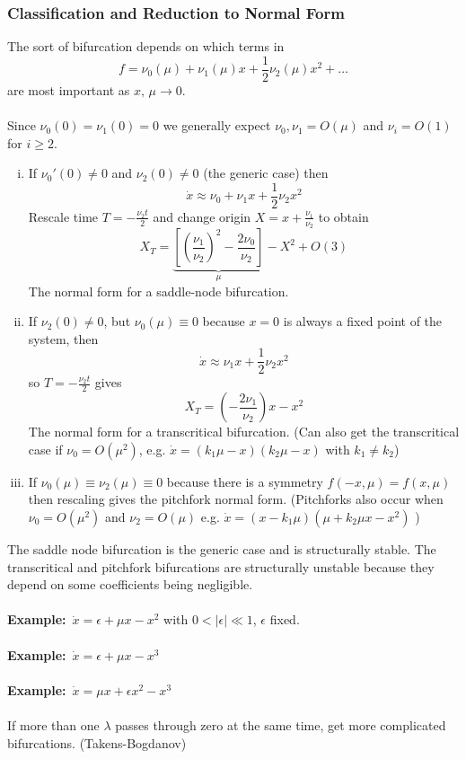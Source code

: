 \documentclass{article}
\newcommand{\example}{\textbf{Example:}}                    %
\begin{document}
\subsubsection*{Classification and Reduction to Normal Form}
The sort of bifurcation depends on which terms in 
\[ f = \nu_0(\mu) + \nu_1(\mu) x + \frac{1}{2} \nu_2 (\mu) x^2 + \dots \]
are most important as $x, \, \mu \to 0$.
\\
\\
Since $\nu_0(0)=\nu_1(0) =0$ we generally expect $\nu_0,\nu_1 = O(\mu)$ and
$\nu_i = O(1)$ for $i \geq 2$.
\begin{enumerate}[(i)]
\item If $\nu_0'(0) \neq 0$ and $\nu_2(0) \neq 0$ (the generic case) then
      \[ \dot{x} \approx \nu_0 + \nu_1 x + \frac{1}{2} \nu_2 x^2 \]
      Rescale time $\displaystyle T = -\frac{\nu_2 t}{2}$ and change origin
      $\displaystyle X = x + \frac{\nu_1}{\nu_2}$ to obtain
      \[ X_T = \underbrace{\left[ \left( \frac{\nu_1}{\nu_2} \right)^2 - 
      \frac{2\nu_0}{\nu_2} \right]}_{\mu} - X^2 + O(3) \]
      The normal form for a saddle-node bifurcation.
\item If $\nu_2(0) \neq 0$, but $\nu_0 (\mu)\equiv 0$ because $x=0$ is always
      a fixed point of the system, then
      \[ \dot{x} \approx \nu_1 x + \frac{1}{2} \nu_2 x^2 \]
      so $\displaystyle T = -\frac{\nu_2 t}{2} $ gives 
      \[ X_T = \left( -\frac{2\nu_1}{\nu_2} \right)x -x^2 \] 
      The normal form for a transcritical bifurcation. (Can also get the
      transcritical case if $\nu_0 = O(\mu^2)$, e.g. $\dot{x} = (k_1 \mu -x)
      (k_2 \mu -x)$ with $k_1 \neq k_2$)
\item If $\nu_0(\mu) \equiv \nu_2(\mu) \equiv 0$ because there is a symmetry
      $f(-x,\mu) = f(x,\mu)$ then rescaling gives the pitchfork normal form.
      (Pitchforks also occur when $\nu_0 = O(\mu^2)$ and $\nu_2 = O(\mu)$ e.g.
       $\dot{x} = ( x - k_1 \mu)(\mu + k_2 \mu x - x^2) $ )
\end{enumerate}
The saddle node bifurcation is the generic case and is structurally stable.
The transcritical and pitchfork bifurcations are structurally unstable 
because they depend on some coefficients being negligible.
\\
\\
\example\ $\dot{x} = \epsilon + \mu x - x^2$ with $0 < |\epsilon| \ll 1$, 
$\epsilon$ fixed.
\\
\\
\example\ $\dot{x} = \epsilon + \mu x - x^3$
\\
\\
\example\ $\dot{x} =\mu x + \epsilon x^2 - x^3$
\\
\\
If more than one $\lambda$ passes through zero at the same time,  get more 
complicated bifurcations. (Takens-Bogdanov)
\end{document}
